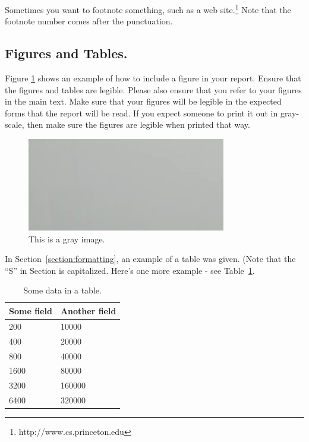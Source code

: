 \documentclass[pageno]{jpaper}
\begin{document}
Sometimes you want to footnote something, such as a web
site.\footnote{http://www.cs.princeton.edu}  Note that the footnote
number comes after the punctuation.

\subsection{Figures and Tables.}

Figure \ref{fig:gray} shows an example of how to include a figure in
your report.  
Ensure that the figures and
tables are legible.  Please also ensure that you refer to your
figures in the main text. Make sure that your figures will be legible
in the expected forms that the report will be read.  If you expect someone
to print it out in gray-scale, then make sure the figures are legible 
when printed that way.  

\begin{figure}[hbt]
\centering
\includegraphics[width=0.75\linewidth]{gray.jpg}
\caption{This is a gray image.}
\label{fig:gray}
\end{figure}

In Section~\ref{section:formatting}, an example of a table was given.
(Note that the ``S'' in Section is capitalized.  Here's one more
example - see Table~\ref{table:data}.

\begin{table}[hbt]
  \centering
  \begin{tabular}{|l|l|} \hline
    \textbf{Some field} & \textbf{Another field}\\\hline
    200          &  10000 \\ \hline 
    400          &  20000 \\ \hline 
    800          &  40000 \\ \hline 
    1600        &  80000 \\ \hline 
    3200        &  160000 \\ \hline 
    6400        &  320000 \\ \hline 
  \end{tabular}
  \caption{Some data in a table. }
  \label{table:data}
\end{table}
\end{document}
